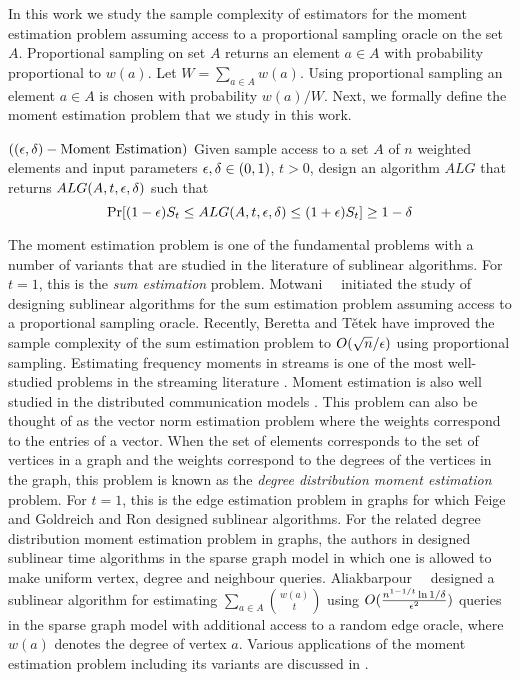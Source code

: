 In this work we study the sample complexity of estimators for the moment estimation problem assuming access to a proportional sampling oracle on the set $A$. Proportional sampling on set $A$ returns an element $a\in A$ with probability proportional to $w(a)$. Let $W=\sum_{a\in A} w(a)$. Using proportional sampling an element $a\in A$ is chosen with probability $w(a)/W$. Next, we formally define the moment estimation problem that we study in this work.

\begin{defn}$((\epsilon,\delta)-\text{Moment Estimation})$ Given sample access to a set $A$ of $n$ weighted elements and input parameters $\epsilon,\delta\in (0,1)$, $t>0$, design an algorithm $ALG$ that returns $ALG(A,t,\epsilon,\delta)$ such that $$\Pr[(1-\epsilon)S_t\leq ALG(A,t,\epsilon,\delta)\leq (1+\epsilon)S_t]\geq 1-\delta$$ \end{defn}


The moment estimation problem is one of the fundamental problems with a number of variants that are studied in the literature of sublinear algorithms. For $t=1$, this is the {\it sum estimation} problem. Motwani~\etal~\cite{MPX2007} initiated the study of designing sublinear algorithms for the sum estimation problem assuming access to a proportional sampling oracle. Recently, Beretta and T{\v{e}}tek \cite{BT2022} have improved the sample complexity of the sum estimation problem to $O(\sqrt{n}/\epsilon)$ using proportional sampling. Estimating frequency moments in streams is one of the most well-studied problems in the streaming literature \cite{AMS1999}. Moment estimation is also well studied in the distributed communication models \cite{JW2023}. This problem can also be thought of as the vector norm estimation problem where the weights correspond to the entries of a vector. When the set of elements corresponds to the set of vertices in a graph and the weights correspond to the degrees of the vertices in the graph, this problem is known as the {\it degree distribution moment estimation} problem. For $t=1$, this is the edge estimation problem in graphs for which Feige \cite{F2006} and Goldreich and Ron \cite{GR2008} designed sublinear algorithms. For the related degree distribution moment estimation problem in graphs, the authors in \cite{ERS2018,ERS2019,GRS2011} designed sublinear time algorithms in the sparse graph model in which one is allowed to make uniform vertex, degree and neighbour queries. Aliakbarpour~\etal~\cite{ABGPRY2018} designed a sublinear algorithm for estimating $\sum_{a\in A} {w(a)\choose t}$ using $O(\frac{n^{1-1/t}\ln 1/\delta}{\epsilon^2})$ queries in the sparse graph model with additional access to a random edge oracle, where $w(a)$ denotes the degree of vertex $a$. Various applications of the moment estimation problem including its variants are discussed in \cite{ERS2018,ABGPRY2018,BT2022}.


